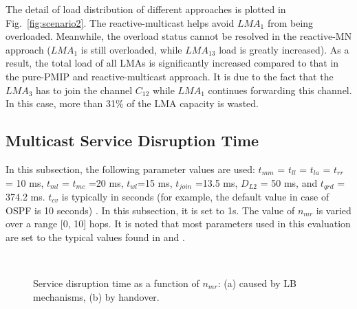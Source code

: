 The detail of load distribution of different approaches is plotted in Fig.~\ref{fig:scenario2}. The reactive-multicast helps avoid $LMA_{1}$ from being overloaded. Meanwhile, the overload status cannot be resolved in the reactive-MN approach ($LMA_{1}$ is still overloaded, while $LMA_{13}$ load is greatly increased). As a result, the total load of all LMAs is significantly increased compared to that in the pure-PMIP and reactive-multicast approach. It is due to the fact that the $LMA_{3}$ has to join the channel $C_{12}$ while $LMA_{1}$ continues forwarding this channel. In this case, more than 31\% of the LMA capacity is wasted. 
\subsection{Multicast Service Disruption Time}
In this subsection, the following parameter values are used: $t_{mm}$ = $t_{ll}$ 
= $t_{la}$ = $t_{rr}$ = 10 ms, $t_{ml}$ = $t_{mc}$ =20 ms, $t_{wl}$=15 ms, $t_{join}$ =13.5 ms, $D_{L2}$ = 50 ms, and $t_{qrd}$ = 374.2 ms. $t_{cv}$ is typically in seconds (for example, the default value in case of OSPF is 10 seconds) \cite{ospf_convergence,ospf_timer}. In this subsection, it is set to 1s. The value of $n_{mr}$ is varied over a range [0, 10] hops. It is noted that most parameters used in this evaluation are set to the typical values found in \cite{Thinh_WCNC_Multicast} and \cite{dsrm}. 

\begin{figure}[h!]
\centering
{}\,\,\,\,\,\,
\caption[Service disruption time as a function of the average hop-count distances.]{Service disruption time as a function of $n_{mr}$: (a) caused by LB mechanisms, (b) by handover.}
\label{fig:sd}
\end{figure}

